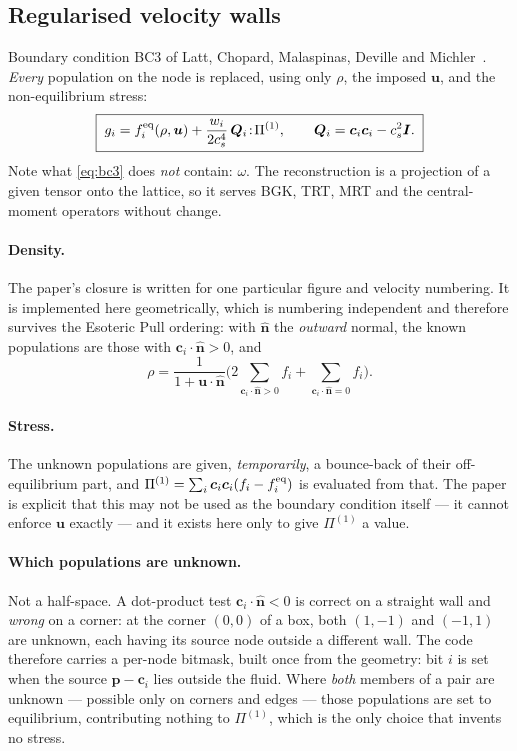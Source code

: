 \documentclass[11pt,a4paper]{article}
\newcommand{\cs}{c_s}
\newcommand{\ci}{\bm{c}_i}
\newcommand{\uu}{\bm{u}}
\begin{document}
\subsection{Regularised velocity walls}
\label{sec:regularized}

Boundary condition BC3 of Latt, Chopard, Malaspinas, Deville and
Michler~\cite{latt2008}. \emph{Every} population on the node is replaced, using
only $\rho$, the imposed $\uu$, and the non-equilibrium stress:
\begin{equation}
  \boxed{\;
  g_i = f_i^{\rm eq}(\rho,\uu) + \frac{w_i}{2\cs^4}\,\bm{Q}_i\!:\!\Pi^{(1)},
  \qquad \bm{Q}_i = \ci\ci - \cs^2\bm{I}. \;}
  \label{eq:bc3}
\end{equation}
Note what \eqref{eq:bc3} does \emph{not} contain: $\omega$. The reconstruction is
a projection of a given tensor onto the lattice, so it serves BGK, TRT, MRT and
the central-moment operators without change.

\paragraph{Density.} The paper's closure is written for one particular figure and
velocity numbering. It is implemented here geometrically, which is numbering
independent and therefore survives the Esoteric Pull ordering: with $\hat{\bm n}$
the \emph{outward} normal, the known populations are those with
$\ci\!\cdot\!\hat{\bm n}>0$, and
\begin{equation}
  \rho = \frac{1}{1+\uu\cdot\hat{\bm n}}
         \Big(2\!\!\sum_{\ci\cdot\hat{\bm n}>0}\!\! f_i
              + \!\!\sum_{\ci\cdot\hat{\bm n}=0}\!\! f_i\Big).
  \label{eq:bc3rho}
\end{equation}

\paragraph{Stress.} The unknown populations are given, \emph{temporarily}, a
bounce-back of their off-equilibrium part, and $\Pi^{(1)}=\sum_i\ci\ci(f_i-f_i^{\rm eq})$
is evaluated from that. The paper is explicit that this may not be used as the
boundary condition itself --- it cannot enforce $\uu$ exactly --- and it exists
here only to give $\Pi^{(1)}$ a value.

\paragraph{Which populations are unknown.} Not a half-space. A dot-product test
$\ci\!\cdot\!\hat{\bm n}<0$ is correct on a straight wall and \emph{wrong} on a
corner: at the corner $(0,0)$ of a box, both $(1,-1)$ and $(-1,1)$ are unknown,
each having its source node outside a different wall. The code therefore carries
a per-node bitmask, built once from the geometry: bit $i$ is set when the source
$\bm{p}-\ci$ lies outside the fluid. Where \emph{both} members of a pair are
unknown --- possible only on corners and edges --- those populations are set to
equilibrium, contributing nothing to $\Pi^{(1)}$, which is the only choice that
invents no stress.
\end{document}
